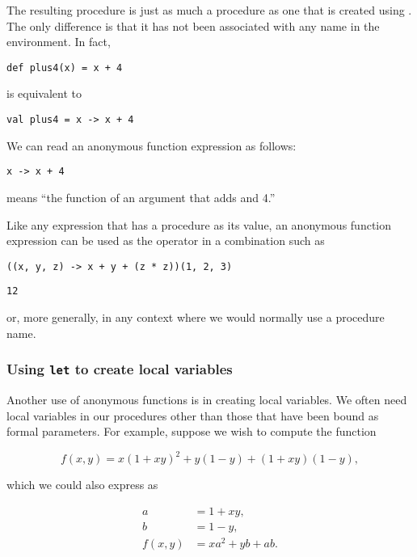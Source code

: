 The resulting procedure is just as much a procedure as one that is created using . The only difference is that it has not been associated with any name in the environment. In fact,

\begin{lstlisting}[style=slate]
def plus4(x) = x + 4
\end{lstlisting}

is equivalent to

\begin{lstlisting}[style=slate]
val plus4 = x -> x + 4
\end{lstlisting}

We can read an anonymous function expression as follows:

\begin{lstlisting}[style=slate]
x -> x + 4
\end{lstlisting}

means ``the function of an argument  that adds  and 4.''

Like any expression that has a procedure as its value, an anonymous function expression can be used as the operator in a combination such as

\begin{lstlisting}[style=slate]
((x, y, z) -> x + y + (z * z))(1, 2, 3)
\end{lstlisting}
\begin{verbatim}
12
\end{verbatim}

or, more generally, in any context where we would normally use a procedure name.

\subsubsection{Using \texttt{let} to create local variables}

Another use of anonymous functions is in creating local variables. We often need local variables in our procedures other than those that have been bound as formal parameters. For example, suppose we wish to compute the function

\[
f(x, y) = x(1 + xy)^2 + y(1 - y) + (1 + xy)(1 - y),
\]

which we could also express as

\begin{align}
a &= 1 + xy, \\
b &= 1 - y, \\
f(x, y) &= xa^2 + yb + ab.
\end{align}

